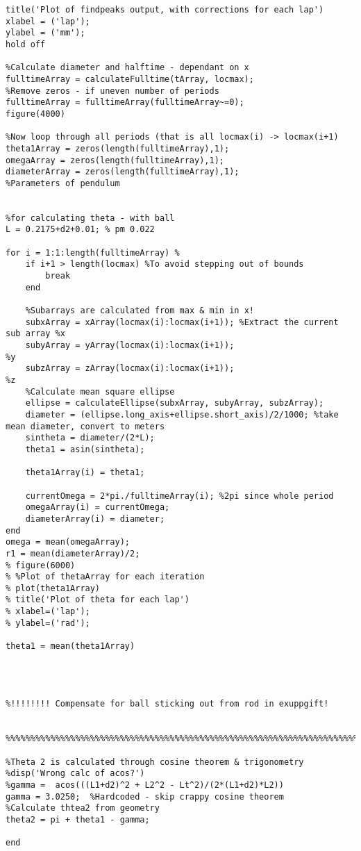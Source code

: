 \begin{lstlisting}[style=Matlab-editor]
title('Plot of findpeaks output, with corrections for each lap')
xlabel = ('lap');
ylabel = ('mm');
hold off

%Calculate diameter and halftime - dependant on x
fulltimeArray = calculateFulltime(tArray, locmax);
%Remove zeros - if uneven number of periods
fulltimeArray = fulltimeArray(fulltimeArray~=0);
figure(4000)

%Now loop through all periods (that is all locmax(i) -> locmax(i+1)
theta1Array = zeros(length(fulltimeArray),1);
omegaArray = zeros(length(fulltimeArray),1);
diameterArray = zeros(length(fulltimeArray),1);
%Parameters of pendulum


%for calculating theta - with ball
L = 0.2175+d2+0.01; % pm 0.022

for i = 1:1:length(fulltimeArray) %
    if i+1 > length(locmax) %To avoid stepping out of bounds
        break
    end
    
    %Subarrays are calculated from max & min in x!
    subxArray = xArray(locmax(i):locmax(i+1)); %Extract the current sub array %x
    subyArray = yArray(locmax(i):locmax(i+1));                                %y
    subzArray = zArray(locmax(i):locmax(i+1));                                %z
    %Calculate mean square ellipse
    ellipse = calculateEllipse(subxArray, subyArray, subzArray);
    diameter = (ellipse.long_axis+ellipse.short_axis)/2/1000; %take mean diameter, convert to meters
    sintheta = diameter/(2*L);
    theta1 = asin(sintheta);
    
    theta1Array(i) = theta1;
    
    currentOmega = 2*pi./fulltimeArray(i); %2pi since whole period
    omegaArray(i) = currentOmega;
    diameterArray(i) = diameter;
end
omega = mean(omegaArray);
r1 = mean(diameterArray)/2;
% figure(6000)
% %Plot of thetaArray for each iteration
% plot(theta1Array)
% title('Plot of theta for each lap')
% xlabel=('lap');
% ylabel=('rad');

theta1 = mean(theta1Array)




%!!!!!!!! Compensate for ball sticking out from rod in exuppgift!


%%%%%%%%%%%%%%%%%%%%%%%%%%%%%%%%%%%%%%%%%%%%%%%%%%%%%%%%%%%%%%%%%%%%%%%%%%%%%%%%%%%%%%%%%%%%%%%%%

%Theta 2 is calculated through cosine theorem & trigonometry
%disp('Wrong calc of acos?')
%gamma =  acos(((L1+d2)^2 + L2^2 - Lt^2)/(2*(L1+d2)*L2))
gamma = 3.0250;  %Hardcoded - skip crappy cosine theorem
%Calculate thtea2 from geometry
theta2 = pi + theta1 - gamma;

end




\end{lstlisting}
